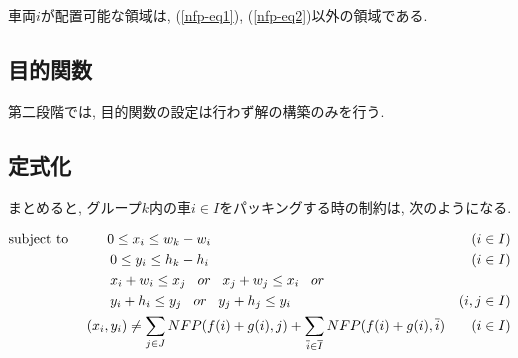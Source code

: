車両$i$が配置可能な領域は, (\ref{nfp-eq1}), (\ref{nfp-eq2})以外の領域である. 

\subsection{目的関数}
第二段階では, 目的関数の設定は行わず解の構築のみを行う. 

\subsection{定式化}
まとめると, グループ$k$内の車$i \in I$をパッキングする時の制約は, 次のようになる. 
\begin{center}  
\begin{align}
    & \textrm{subject\ to} \hspace{1cm}0 \leq x_i \leq w_k - w_i & (i \in I)\\
    & \hspace{2.6cm} 0 \leq y_i \leq h_k - h_i & (i \in I)\\
    & \hspace{2.6cm} x_i + w_i \leq x_j \hspace{0.3cm}or\hspace{0.3cm} x_j + w_j \leq x_i \hspace{0.3cm}or \nonumber \\
    & \hspace{2.6cm} y_i + h_i \leq y_j \hspace{0.3cm}or\hspace{0.3cm} y_j + h_j \leq y_i &(i,j \in I)\\
    & \hspace{2cm} (x_i, y_i) \neq \sum_{j \in J} NFP(f(i)+g(i),j) + \sum_{\overline{i} \in \overline{I}}NFP(f(i)+g(i),\overline{i}) & (i \in I)
\end{align}
\end{center}